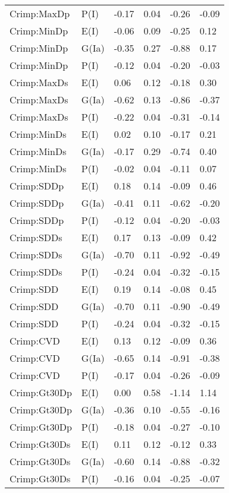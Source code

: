 \begin{center}
\begin{longtable}{|p{1.1in}|p{0.7in}|p{0.7in}|p{0.6in}|p{0.6in}|p{0.6in}|}
  Crimp:MaxDp & P(I) & -0.17 & 0.04 & -0.26 & -0.09 \\ 
  Crimp:MinDp & E(I) & -0.06 & 0.09 & -0.25 & 0.12 \\ 
  Crimp:MinDp & G(Ia) & -0.35 & 0.27 & -0.88 & 0.17 \\ 
  Crimp:MinDp & P(I) & -0.12 & 0.04 & -0.20 & -0.03 \\ 
  Crimp:MaxDs & E(I) & 0.06 & 0.12 & -0.18 & 0.30 \\ 
  Crimp:MaxDs & G(Ia) & -0.62 & 0.13 & -0.86 & -0.37 \\ 
  Crimp:MaxDs & P(I) & -0.22 & 0.04 & -0.31 & -0.14 \\ 
  Crimp:MinDs & E(I) & 0.02 & 0.10 & -0.17 & 0.21 \\ 
  Crimp:MinDs & G(Ia) & -0.17 & 0.29 & -0.74 & 0.40 \\ 
  Crimp:MinDs & P(I) & -0.02 & 0.04 & -0.11 & 0.07 \\ 
  Crimp:SDDp & E(I) & 0.18 & 0.14 & -0.09 & 0.46 \\ 
  Crimp:SDDp & G(Ia) & -0.41 & 0.11 & -0.62 & -0.20 \\ 
  Crimp:SDDp & P(I) & -0.12 & 0.04 & -0.20 & -0.03 \\ 
  Crimp:SDDs & E(I) & 0.17 & 0.13 & -0.09 & 0.42 \\ 
  Crimp:SDDs & G(Ia) & -0.70 & 0.11 & -0.92 & -0.49 \\ 
  Crimp:SDDs & P(I) & -0.24 & 0.04 & -0.32 & -0.15 \\ 
  Crimp:SDD & E(I) & 0.19 & 0.14 & -0.08 & 0.45 \\ 
  Crimp:SDD & G(Ia) & -0.70 & 0.11 & -0.90 & -0.49 \\ 
  Crimp:SDD & P(I) & -0.24 & 0.04 & -0.32 & -0.15 \\ 
  Crimp:CVD & E(I) & 0.13 & 0.12 & -0.09 & 0.36 \\ 
  Crimp:CVD & G(Ia) & -0.65 & 0.14 & -0.91 & -0.38 \\ 
  Crimp:CVD & P(I) & -0.17 & 0.04 & -0.26 & -0.09 \\ 
  Crimp:Gt30Dp & E(I) & 0.00 & 0.58 & -1.14 & 1.14 \\ 
  Crimp:Gt30Dp & G(Ia) & -0.36 & 0.10 & -0.55 & -0.16 \\ 
  Crimp:Gt30Dp & P(I) & -0.18 & 0.04 & -0.27 & -0.10 \\ 
  Crimp:Gt30Ds & E(I) & 0.11 & 0.12 & -0.12 & 0.33 \\ 
  Crimp:Gt30Ds & G(Ia) & -0.60 & 0.14 & -0.88 & -0.32 \\ 
  Crimp:Gt30Ds & P(I) & -0.16 & 0.04 & -0.25 & -0.07 \\ 

\end{longtable}
\end{center}
